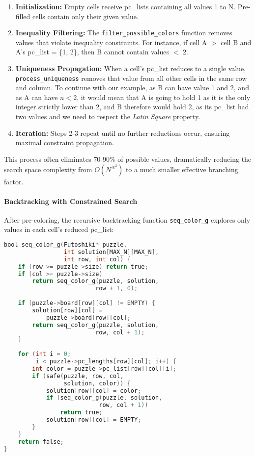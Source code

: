 \begin{enumerate}
    \item \textbf{Initialization:} Empty cells receive pc\_lists containing all values 1 to N. Pre-filled cells contain only their given value.
    
    \item \textbf{Inequality Filtering:} The \texttt{filter\_possible\_colors} function removes values that violate inequality constraints. For instance, if cell A $\gt$ cell B and A's pc\_list = \{1, 2\}, then B cannot contain values $\lt$ 2.
    
    \item \textbf{Uniqueness Propagation:} When a cell's pc\_list reduces to a single value, \texttt{process\_uniqueness} removes that value from all other cells in the same row and column. To continue with our example, as B can have value 1 and 2, and as A can have $n \lt 2$, it would mean that A is going to hold 1 as it is the only integer strictly lower than 2, and B therefore would hold 2, as its pc\_list had two values and we need to respect the \textit{Latin Square} property.
    
    \item \textbf{Iteration:} Steps 2-3 repeat until no further reductions occur, ensuring maximal constraint propagation.
\end{enumerate}

This process often eliminates 70-90\% of possible values, dramatically reducing the search space complexity from $O(N^{N^2})$ to a much smaller effective branching factor.

\paragraph{Backtracking with Constrained Search}
\label{par:backtrack_with_csp}
After pre-coloring, the recursive backtracking function \texttt{seq\_color\_g} explores only values in each cell's reduced pc\_list:

\begin{lstlisting}[language=C, caption=Sequential backtracking core]
bool seq_color_g(Futoshiki* puzzle, 
                 int solution[MAX_N][MAX_N], 
                 int row, int col) {
    if (row >= puzzle->size) return true;
    if (col >= puzzle->size) 
        return seq_color_g(puzzle, solution, 
                          row + 1, 0);
    
    if (puzzle->board[row][col] != EMPTY) {
        solution[row][col] = 
            puzzle->board[row][col];
        return seq_color_g(puzzle, solution, 
                          row, col + 1);
    }
    
    for (int i = 0; 
         i < puzzle->pc_lengths[row][col]; i++) {
        int color = puzzle->pc_list[row][col][i];
        if (safe(puzzle, row, col, 
                 solution, color)) {
            solution[row][col] = color;
            if (seq_color_g(puzzle, solution, 
                           row, col + 1))
                return true;
            solution[row][col] = EMPTY;
        }
    }
    return false;
}
\end{lstlisting}


